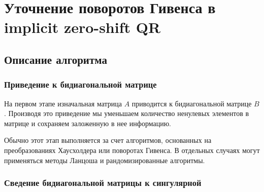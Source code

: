 \section{Уточнение поворотов Гивенса в implicit zero-shift QR}

\subsection{Описание алгоритма}

\subsubsection{Приведение к бидиагональной матрице}

На первом этапе изначальная матрица $A$ приводится к бидиагональной матрице $B$. Производя это приведение мы уменьшаем количество ненулевых элементов в матрице и сохраняем заложенную в нее информацию.

Обычно этот этап выполняется за счет алгоритмов, основанных на преобразованиях Хаусхолдера или поворотах Гивенса. В отдельных случаях могут применяться методы Ланцоша и рандомизированные алгоритмы. 

\subsubsection{Сведение бидиагональной матрицы к сингулярной}

